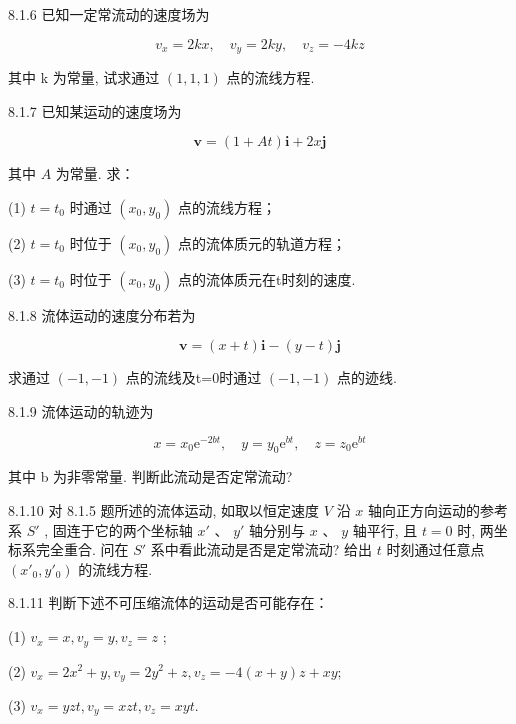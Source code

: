 \begin{problem}{8.1.6}
已知一定常流动的速度场为

\[
v _ {x} = 2 k x, \quad v _ {y} = 2 k y, \quad v _ {z} = - 4 k z
\]

其中 k 为常量, 试求通过 $(1,1,1)$ 点的流线方程.
\end{problem}
\clearpage


\begin{problem}{8.1.7}
已知某运动的速度场为

\[
\boldsymbol {v} = (1 + A t) \boldsymbol {i} + 2 x \boldsymbol {j}
\]

其中 $A$ 为常量. 求：

(1) $t=t_{0}$ 时通过 $(x_{0},y_{0})$ 点的流线方程；

(2) $t=t_{0}$ 时位于 $(x_{0},y_{0})$ 点的流体质元的轨道方程；

(3) $t=t_{0}$ 时位于 $(x_{0},y_{0})$ 点的流体质元在t时刻的速度.
\end{problem}
\clearpage


\begin{problem}{8.1.8}
流体运动的速度分布若为

\[
\boldsymbol {v} = (x + t) \boldsymbol {i} - (y - t) \boldsymbol {j}
\]

求通过 $(-1,-1)$ 点的流线及t=0时通过 $(-1,-1)$ 点的迹线.
\end{problem}
\clearpage


\begin{problem}{8.1.9}
流体运动的轨迹为

\[
x = x _ {0} \mathrm{e} ^ {- 2 b t}, \quad y = y _ {0} \mathrm{e} ^ {b t}, \quad z = z _ {0} \mathrm{e} ^ {b t}
\]

其中 b 为非零常量. 判断此流动是否定常流动?
\end{problem}
\clearpage


\begin{problem}{8.1.10}
对 8.1.5 题所述的流体运动, 如取以恒定速度 $V$ 沿 $x$ 轴向正方向运动的参考系 $S'$ , 固连于它的两个坐标轴 $x'$ 、 $y'$ 轴分别与 $x$ 、 $y$ 轴平行, 且 $t=0$ 时, 两坐标系完全重合. 问在 $S'$ 系中看此流动是否是定常流动? 给出 $t$ 时刻通过任意点 $(x'_{0}, y'_{0})$ 的流线方程.
\end{problem}
\clearpage


\begin{problem}{8.1.11}
判断下述不可压缩流体的运动是否可能存在：

(1) $v_{x} = x, v_{y} = y, v_{z} = z$ ; 

(2) $v_{x}=2x^{2}+y,v_{y}=2y^{2}+z,v_{z}=-4(x+y)z+xy;$ 

(3) $v_{x}=yzt,v_{y}=xzt,v_{z}=xyt.$
\end{problem}
\clearpage


